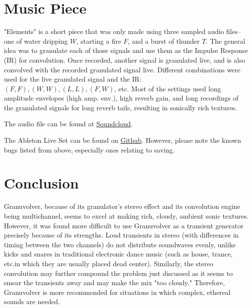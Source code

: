 \documentclass{article}
\begin{document}
	\section{Music Piece}
		"Elements" is a short piece that was only made using three sampled audio files--one of water dripping $W$, starting a fire $F$, and a burst of thunder $T$. The general idea was to granulate each of those signals and use them as the Impulse Response (IR) for convolution. Once recorded, another signal is granulated live, and is also convolved with the recorded granulated signal live. Different combinations were used for the live granulated signal and the IR: $(F,F), (W,W), (L,L), (F,W)$, etc. Most of the settings used long amplitude envelopes (high amp. env.), high reverb gain, and long recordings of the granulated signals for long reverb tails, resulting in sonically rich textures.

		The audio file can be found at \href{https://soundcloud.com/edderic/elements}{Soundcloud}.

		The Ableton Live Set can be found on \href{https://github.com/Edderic/Granuvolver/tree/master/Senior%20Thesis%20Project}{Github}.  However, please note the known bugs listed from above, especially ones relating to saving.

	\section{Conclusion}
		Granuvolver, because of its granulator's stereo effect and its convolution engine being multichannel, seems to excel at making rich, cloudy, ambient sonic textures. However, it was found more difficult to use Granuvolver as a transient generator precisely because of its strengths. Loud transients in stereo (with differences in timing between the two channels) do not distribute soundwaves evenly, unlike kicks and snares in traditional electronic dance music (such as house, trance, etc.in which they are usually placed dead center).  Similarly, the stereo convolution may further compound the problem just discussed as it seems to smear the transients away and may make the mix "too cloudy."  Therefore, Granuvolver is more recommended for situations in which complex, ethereal sounds are needed.
\end{document}
